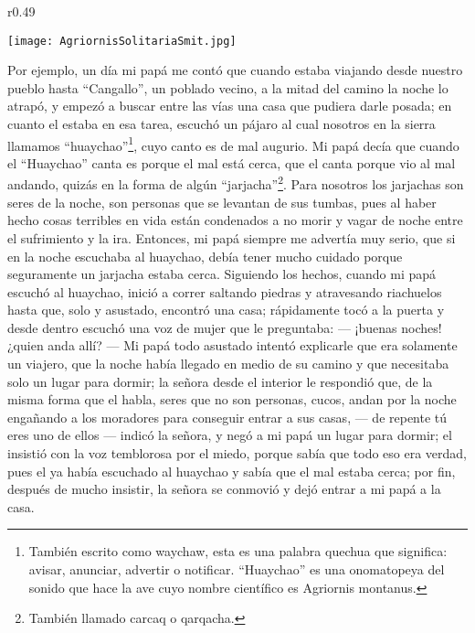 \begin{wrapfigure}{r}{0.49\textwidth}
  \begin{center}
  \vspace{-20pt}
    \texttt{[image: AgriornisSolitariaSmit.jpg]}
  \end{center}
  \vspace{-20pt}
\end{wrapfigure}
Por ejemplo, un día mi papá me contó que cuando estaba viajando desde nuestro pueblo hasta ``Cangallo'', un poblado vecino, a la mitad del camino la noche lo atrapó, y empezó a buscar entre las vías una casa que pudiera darle posada; en cuanto el estaba en esa tarea, escuchó un pájaro al cual nosotros en la sierra llamamos ``huaychao''\footnote{También escrito como waychaw, esta es una palabra quechua que significa: avisar, anunciar, advertir o notificar. ``Huaychao'' es una onomatopeya del sonido que hace la ave cuyo nombre científico es Agriornis montanus.}, cuyo canto es de mal augurio.
Mi papá decía que cuando el ``Huaychao'' canta es porque el mal está cerca, que el canta porque vio al mal andando, quizás en la forma de algún ``jarjacha''\footnote{También llamado carcaq o qarqacha.}. Para nosotros los jarjachas son seres de la noche, son personas que se levantan de sus tumbas, pues al haber hecho cosas terribles en vida están condenados a no morir y vagar de noche entre el sufrimiento y la ira.
Entonces, mi papá siempre me advertía muy serio, que si en la noche escuchaba al huaychao, debía tener mucho cuidado porque seguramente un jarjacha estaba cerca.
Siguiendo los hechos, cuando mi papá escuchó al huaychao, inició a correr saltando piedras y atravesando riachuelos hasta que, solo y asustado, encontró una casa; rápidamente tocó a la puerta y desde dentro escuchó una voz de mujer que le preguntaba: --- ¡buenas noches! ¿quien anda allí? ---
Mi papá todo asustado intentó explicarle que era solamente un viajero, que la noche había llegado en medio de su camino y que necesitaba solo un lugar para dormir; la señora desde el interior le respondió que, de la misma forma que el habla, seres que no son personas, cucos, andan por la noche engañando a los moradores para conseguir entrar a sus casas, --- de repente tú eres uno de ellos --- indicó la señora, y negó a mi papá un lugar para dormir; el insistió con la voz temblorosa por el miedo, porque sabía que todo eso era verdad, pues el ya había escuchado al huaychao y sabía que el mal estaba cerca; por fin, después de mucho insistir, la señora se conmovió y dejó entrar a mi papá a la casa.
